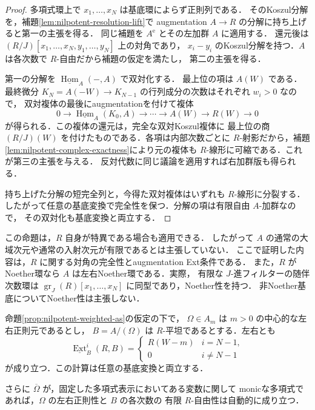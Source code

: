 \begin{proof}
多項式環上で $x_1,\ldots,x_N$ は基底環によらず正則列である．
そのKoszul分解を，補題\ref{lem:nilpotent-resolution-lift}で
augmentation $A\to R$ の分解に持ち上げると第一の主張を得る．
同じ補題を $A^{\mathrm e}$ とその左加群 $A$ に適用する．
還元後は $(R/J)[x_1,\ldots,x_N,y_1,\ldots,y_N]$ 上の対角であり，
$x_i-y_i$ のKoszul分解を持つ．$A$ は各次数で $R$-自由だから補題の仮定を満たし，
第二の主張を得る．

第一の分解を $\underline{\operatorname{Hom}}_A(-,A)$ で双対化する．
最上位の項は $A(W)$ である．最終微分
$K_N=A(-W)\to K_{N-1}$ の行列成分の次数はそれぞれ $w_i>0$ なので，
双対複体の最後にaugmentationを付けて複体
\[
 0\longrightarrow\underline{\operatorname{Hom}}_A(K_0,A)
 \longrightarrow\cdots\longrightarrow A(W)
 \longrightarrow R(W)\longrightarrow0
\]
が得られる．この複体の還元は，完全な双対Koszul複体に
最上位の商 $(R/J)(W)$ を付けたものである．各項は内部次数ごとに
$R$-射影だから，補題\ref{lem:nilpotent-complex-exactness}により元の複体も
$R$-線形に可縮である．これが第三の主張を与える．
反対代数に同じ議論を適用すれば右加群版も得られる．

持ち上げた分解の短完全列と，今得た双対複体はいずれも $R$-線形に分裂する．
したがって任意の基底変換で完全性を保つ．分解の項は有限自由 $A$-加群なので，
その双対化も基底変換と両立する．
\end{proof}

\begin{remark}
この命題は，$R$ 自身が特異である場合も適用できる．
したがって $A$ の通常の大域次元や通常の入射次元が有限であるとは主張していない．
ここで証明した内容は，$R$ に関する対角の完全性とaugmentation Ext条件である．
また，$R$ がNoether環なら $A$ は左右Noether環である．実際，
有限な $J$-進フィルターの随伴次数環は
$\operatorname{gr}_J(R)[x_1,\ldots,x_N]$ に同型であり，Noether性を持つ．
非Noether基底についてNoether性は主張しない．
\end{remark}

\begin{proposition}[平坦な中心超曲面商]
\label{prop:flat-central-hypersurface-ext}
命題\ref{prop:nilpotent-weighted-as}の仮定の下で，
$\Omega\in A_m$ は $m>0$ の中心的な左右正則元であるとし，
$B=A/(\Omega)$ は $R$-平坦であるとする．左右とも
\[
 \underline{\operatorname{Ext}}_B^i(R,B)=
 \begin{cases}R(W-m)&i=N-1,\\0&i\neq N-1\end{cases}
\]
が成り立つ．この計算は任意の基底変換と両立する．

さらに $\overline\Omega$ が，固定した多項式表示においてある変数に関して
monicな多項式であれば，$\Omega$ の左右正則性と $B$ の各次数の
有限 $R$-自由性は自動的に成り立つ．
\end{proposition}

